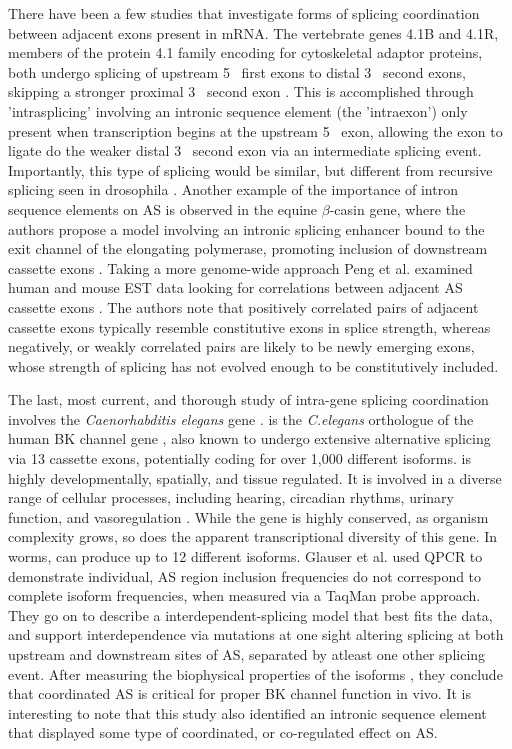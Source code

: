 There have been a few studies that investigate forms of splicing coordination between adjacent exons present in mRNA. The vertebrate genes 4.1B and 4.1R, members of the protein 4.1 family encoding for cytoskeletal adaptor proteins, both undergo splicing of upstream 5\textprime~ first exons to distal 3\textprime~ second exons, skipping a stronger proximal 3\textprime~ second exon \citep{Parra2008, Parra2012}. This is accomplished through 'intrasplicing' involving an intronic sequence element (the 'intraexon') only present when transcription begins at the upstream 5\textprime~ exon, allowing the exon to ligate do the weaker distal 3\textprime~ second exon via an intermediate splicing event. Importantly, this type of splicing would be similar, but different from recursive splicing seen in drosophila \citep{Burnette2005}. Another example of the importance of intron sequence elements on AS is observed in the equine $\beta$-casin gene, where the authors propose a model involving an intronic splicing enhancer bound to the exit channel of the elongating polymerase, promoting inclusion of downstream cassette exons \citep{Lenasi2006}. Taking a more genome-wide approach Peng et al. examined human and mouse EST data looking for correlations between adjacent AS cassette exons \citep{Peng2008}. The authors note that positively correlated pairs of adjacent cassette exons typically resemble constitutive exons in splice strength, whereas negatively, or weakly correlated pairs are likely to be newly emerging exons, whose strength of splicing has not evolved enough to be constitutively included. 

The last, most current, and thorough study of intra-gene splicing coordination involves the \textit{Caenorhabditis elegans} gene \slo{} \citep{Glauser2011, Johnson2011}. \slo{} is the \textit{C.elegans} orthologue of the human BK channel gene \kcnma{}, also known to undergo extensive alternative splicing \citep{Nilsen2010} via 13 cassette exons, potentially coding for over 1,000 different isoforms. \kcnma{} is highly developmentally, spatially, and tissue regulated. It is involved in a diverse range of cellular processes, including hearing, circadian rhythms, urinary function, and vasoregulation \citep{Fodor2009a}. While the gene is highly conserved, as organism complexity grows, so does the apparent transcriptional diversity of this gene. In worms, \slo{} can produce up to 12 different isoforms. Glauser et al. used QPCR to demonstrate individual, AS region inclusion frequencies do not correspond to complete isoform frequencies, when measured via a TaqMan probe approach. They go on to describe a interdependent-splicing model that best fits the data, and support interdependence via mutations at one sight altering splicing at both upstream and downstream sites of AS, separated by atleast one other splicing event. After measuring the biophysical properties of the isoforms \citep{Johnson2011}, they conclude that coordinated AS is critical for proper BK channel function in vivo. It is interesting to note that this study also identified an intronic sequence element that displayed some type of coordinated, or co-regulated effect on AS. 

